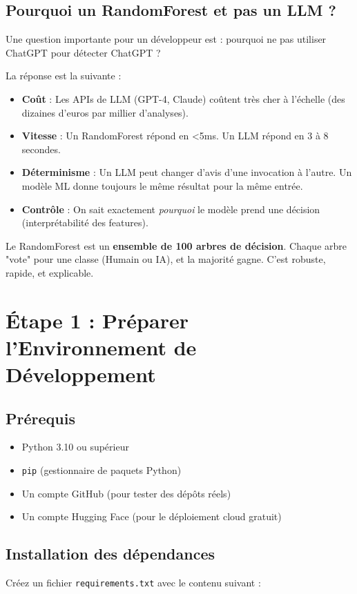 \documentclass[a4paper,11pt]{article}
\begin{document}
\subsection{Pourquoi un RandomForest et pas un LLM ?}
Une question importante pour un développeur est : pourquoi ne pas utiliser ChatGPT pour détecter ChatGPT ?

La réponse est la suivante :
\begin{itemize}
    \item \textbf{Coût} : Les APIs de LLM (GPT-4, Claude) coûtent très cher à l'échelle (des dizaines d'euros par millier d'analyses).
    \item \textbf{Vitesse} : Un RandomForest répond en \textless 5ms. Un LLM répond en 3 à 8 secondes.
    \item \textbf{Déterminisme} : Un LLM peut changer d'avis d'une invocation à l'autre. Un modèle ML donne toujours le même résultat pour la même entrée.
    \item \textbf{Contrôle} : On sait exactement \textit{pourquoi} le modèle prend une décision (interprétabilité des features).
\end{itemize}

Le RandomForest est un \textbf{ensemble de 100 arbres de décision}. Chaque arbre "vote" pour une classe
(Humain ou IA), et la majorité gagne. C'est robuste, rapide, et explicable.


\section{Étape 1 : Préparer l'Environnement de Développement}

\subsection{Prérequis}
\begin{itemize}
    \item Python 3.10 ou supérieur
    \item \texttt{pip} (gestionnaire de paquets Python)
    \item Un compte GitHub (pour tester des dépôts réels)
    \item Un compte Hugging Face (pour le déploiement cloud gratuit)
\end{itemize}

\subsection{Installation des dépendances}
Créez un fichier \texttt{requirements.txt} avec le contenu suivant :
\end{document}
